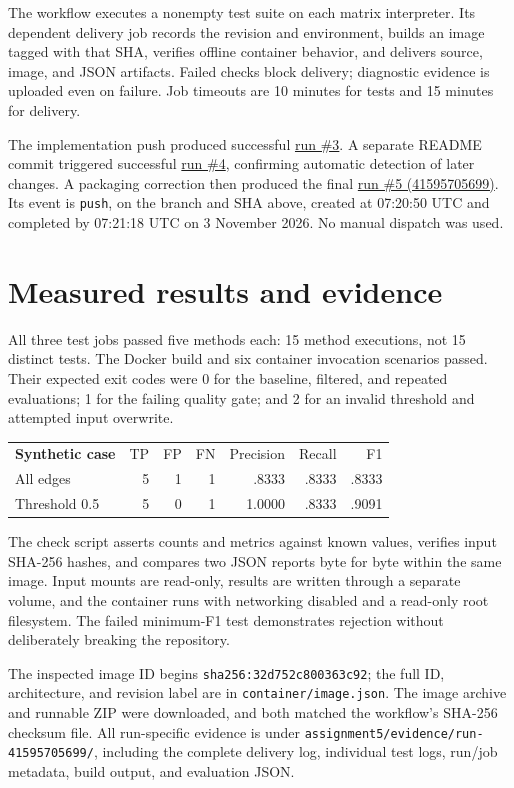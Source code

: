 The workflow executes a nonempty test suite on each matrix interpreter. Its dependent delivery job records the revision and environment, builds an image tagged with that SHA, verifies offline container behavior, and delivers source, image, and JSON artifacts. Failed checks block delivery; diagnostic evidence is uploaded even on failure. Job timeouts are 10 minutes for tests and 15 minutes for delivery.

The implementation push produced successful \href{https://github.com/thgank/taxonomy-evaluator/actions/runs/41594815711}{run \#3}. A separate README commit triggered successful \href{https://github.com/thgank/taxonomy-evaluator/actions/runs/41595046724}{run \#4}, confirming automatic detection of later changes. A packaging correction then produced the final \href{https://github.com/thgank/taxonomy-evaluator/actions/runs/41595705699}{run \#5 (41595705699)}. Its event is \texttt{push}, on the branch and SHA above, created at 07:20:50 UTC and completed by 07:21:18 UTC on 3 November 2026. No manual dispatch was used.

\newpage
\section{Measured results and evidence}
All three test jobs passed five methods each: 15 method executions, not 15 distinct tests. The Docker build and six container invocation scenarios passed. Their expected exit codes were 0 for the baseline, filtered, and repeated evaluations; 1 for the failing quality gate; and 2 for an invalid threshold and attempted input overwrite.

\noindent\begin{tabularx}{\textwidth}{@{}Xrrrrrr@{}}
\textbf{Synthetic case} & TP & FP & FN & Precision & Recall & F1\\
All edges & 5 & 1 & 1 & .8333 & .8333 & .8333\\
Threshold 0.5 & 5 & 0 & 1 & 1.0000 & .8333 & .9091
\end{tabularx}

The check script asserts counts and metrics against known values, verifies input SHA-256 hashes, and compares two JSON reports byte for byte within the same image. Input mounts are read-only, results are written through a separate volume, and the container runs with networking disabled and a read-only root filesystem. The failed minimum-F1 test demonstrates rejection without deliberately breaking the repository.

The inspected image ID begins \texttt{sha256:32d752c800363c92}; the full ID, architecture, and revision label are in \texttt{container/image.json}. The image archive and runnable ZIP were downloaded, and both matched the workflow's SHA-256 checksum file. All run-specific evidence is under \texttt{assignment5/evidence/run-41595705699/}, including the complete delivery log, individual test logs, run/job metadata, build output, and evaluation JSON.


